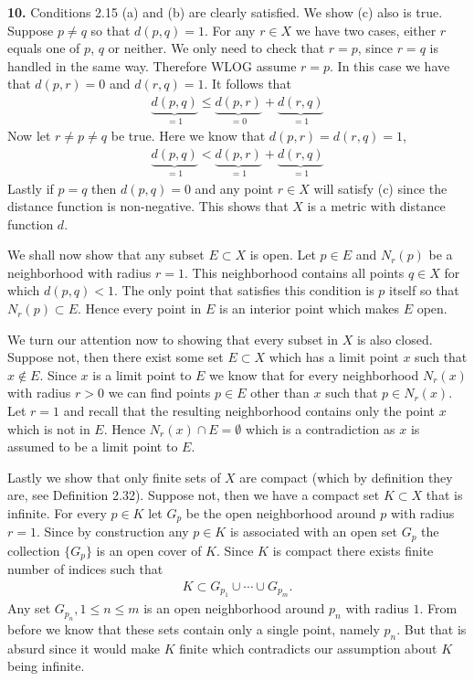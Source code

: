 \documentclass[11pt]{article}
\author{Hesam Pakdaman}
\date{\today}
\title{}
\newcommand{\dist}[2]{d(#1, #2)}
\begin{document}
\noindent\textbf{10.} Conditions 2.15 (a) and (b) are clearly
satisfied. We show (c) also is true. Suppose $p\neq q$ so that
$\dist{p}{q} = 1$. For any $r \in X$ we have two cases, either $r$
equals one of $p$, $q$ or neither. We only need to check that $r = p$,
since $r=q$ is handled in the same way. Therefore WLOG assume
$r=p$. In this case we have that $\dist{p}{r} = 0$ and
$\dist{r}{q} = 1$. It follows that
\begin{align*}
  \underbrace{\dist{p}{q}}_{=1} \leq \underbrace{\dist{p}{r}}_{=0} + \underbrace{\dist{r}{q}}_{=1}
\end{align*}
Now let $r \neq p \neq q$ be true. Here we know that
$\dist{p}{r} = \dist{r}{q} = 1$,
\begin{align*}
  \underbrace{\dist{p}{q}}_{=1} < \underbrace{\dist{p}{r}}_{=1} + \underbrace{\dist{r}{q}}_{=1}
\end{align*}
Lastly if $p=q$ then $\dist{p}{q} = 0$ and any point $r \in X$ will
satisfy (c) since the distance function is non-negative. This shows
that $X$ is a metric with distance function $d$.

We shall now show that any subset $E \subset X$ is open. Let $p \in E$
and $N_r(p)$ be a neighborhood with radius $r =1$. This neighborhood
contains all points $q \in X$ for which $\dist{p}{q} < 1$. The only
point that satisfies this condition is $p$ itself so that
$N_r(p) \subset E$. Hence every point in $E$ is an interior point which
makes $E$ open.

We turn our attention now to showing that every subset in $X$ is also
closed. Suppose not, then there exist some set $E \subset X$ which has
a limit point $x$ such that $x \not\in E$. Since $x$ is a limit point
to $E$ we know that for every neighborhood $N_r(x)$ with radius
$r > 0$ we can find points $p \in E$ other than $x$ such that
$p \in N_r(x)$. Let $r = 1$ and recall that the resulting neighborhood
contains only the point $x$ which is not in $E$. Hence
$N_r(x) \cap E = \emptyset$ which is a contradiction as $x$ is assumed
to be a limit point to $E$.

Lastly we show that only finite sets of $X$ are compact (which by
definition they are, see Definition 2.32). Suppose not, then we have a
compact set $K \subset X$ that is infinite. For every $p\in K$ let
$G_p$ be the open neighborhood around $p$ with radius $r = 1$. Since
by construction any $p \in K$ is associated with an open set $G_p$ the
collection $\{G_p\}$ is an open cover of $K$. Since $K$ is compact
there exists finite number of indices such that
\begin{align*}
  K \subset G_{p_1} \cup \cdots \cup G_{p_m}.
\end{align*}
Any set $G_{p_n}, 1\leq n \leq m$ is an open neighborhood around $p_n$
with radius $1$. From before we know that these sets contain only a
single point, namely $p_n$. But that is absurd since it would make $K$
finite which contradicts our assumption about $K$ being infinite.
\end{document}
